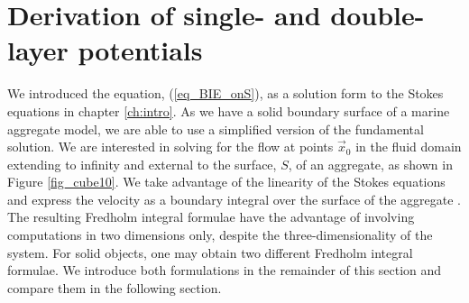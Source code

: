 %
\section{Derivation of single- and double-layer potentials}
We introduced the equation, (\ref{eq_BIE_onS}), as a solution form to the Stokes equations in chapter \ref{ch:intro}. As we have a solid boundary surface of a marine aggregate model, we are able to use a simplified version of the fundamental solution. We are interested in solving for the flow at points $\vec{x}_0$ in the fluid domain extending to infinity and external to the surface, $S$, of an aggregate, as shown in Figure \ref{fig_cube10}.
We take advantage of the linearity of the Stokes equations and express the velocity as a boundary integral over the surface of the aggregate \cite{pozrikidis_boundary_1992, stakgold_boundary_2000}. 
The resulting Fredholm integral formulae have the advantage of involving computations in two dimensions only, despite the three-dimensionality of the system.
For solid objects, one may obtain two different  Fredholm integral formulae. We introduce both formulations in the remainder of this section and compare them in the following section. 
